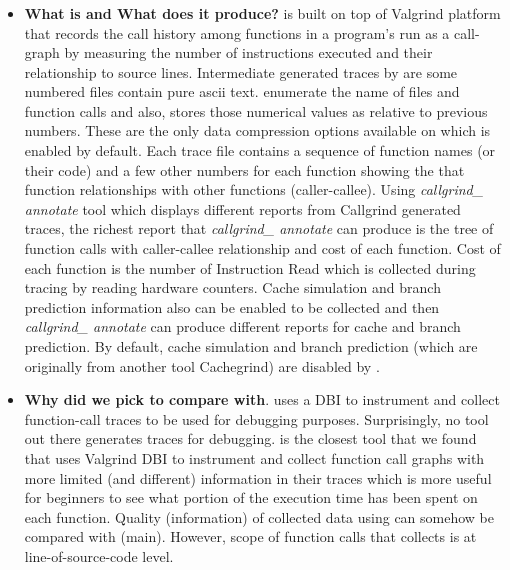 \subsubsection{\callgrind}
\begin{itemize}
\item \textbf{What is \callgrind and What does it produce?} \callgrind is built on top of Valgrind platform that records the call history among functions in a program's run as a call-graph by measuring the number of instructions executed and their relationship to source lines. 
Intermediate generated traces by \callgrind are some numbered files contain pure ascii text. \callgrind enumerate the name of files and function calls and also, stores those numerical values as relative to previous numbers. These are the only data compression options available on \callgrind which is enabled by default. Each \callgrind trace file contains a sequence of function names (or their code) and a few other numbers for each function showing the that function relationships with other functions (caller-callee). Using \textit{callgrind\_ annotate} tool which displays different reports from Callgrind generated traces, the richest report that \textit{callgrind\_ annotate} can produce is the tree of function calls with caller-callee relationship and cost of each function. Cost of each function is the number of Instruction Read which is collected during tracing by reading hardware counters. Cache simulation and branch prediction information also can be enabled to be collected and then \textit{callgrind\_ annotate} can produce different reports for cache and branch prediction. By default, cache simulation and branch prediction (which are originally from another tool Cachegrind) are disabled by \callgrind.
\item \textbf{Why did we pick \callgrind to compare with}. \parlot uses a DBI to instrument and collect function-call traces to be used for debugging purposes. Surprisingly, no tool out there generates traces for debugging. \callgrind is the closest tool that we found that uses Valgrind DBI to instrument and collect function call graphs with more limited (and different) information in their traces which is more useful for beginners to see what portion of the execution time has been spent on each function. Quality (information) of collected data using \callgrind can somehow be compared with \parlot (main). However, scope of function calls that \callgrind collects is at line-of-source-code level.

\end{itemize}
